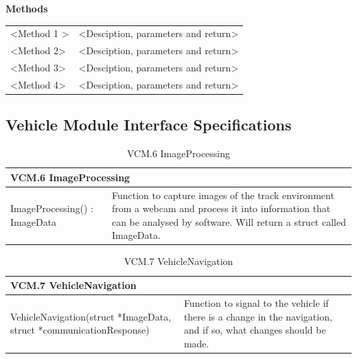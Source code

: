 \documentclass [10pt]{article}
\begin{document}
\textbf{Methods} 
\begin{longtable}{ p{ }  p{ }} \\ 

 
\rowcolor{tableCell} <Method 1 >& <Desciption, parameters and return>\\ 
<Method 2>& <Desciption, parameters and return>\\

\rowcolor{tableCell}<Method 3> & <Desciption, parameters and return> \\ 
<Method 4>& <Desciption, parameters and return> \\

\end{longtable}






\subsection{Vehicle Module Interface Specifications}
\begin{longtable}{| p{ } | p{ } | }\caption{VCM.6 ImageProcessing} \\\hline  
 \multicolumn{2}{|l|}{\textbf {VCM.6 ImageProcessing}}\\ \hline
\cellcolor{tableCell}ImageProcessing() : ImageData & \cellcolor{tableCell}Function to capture images of the track environment from a webcam and process it into information that can be analysed by software. Will return a struct called ImageData.  \\ \hline 



\end{longtable}

\begin{longtable}{| p{ } | p{ } | }\caption{VCM.7 VehicleNavigation} \\\hline  
 \multicolumn{2}{|l|}{\textbf {VCM.7 VehicleNavigation}}\\ \hline
\cellcolor{tableCell}VehicleNavigation(struct *ImageData,  struct *communicationResponse) & \cellcolor{tableCell}Function to signal to the vehicle if there is a change in the navigation, and if so, what changes should be made. \\ \hline 



\end{longtable}
\end{document}
